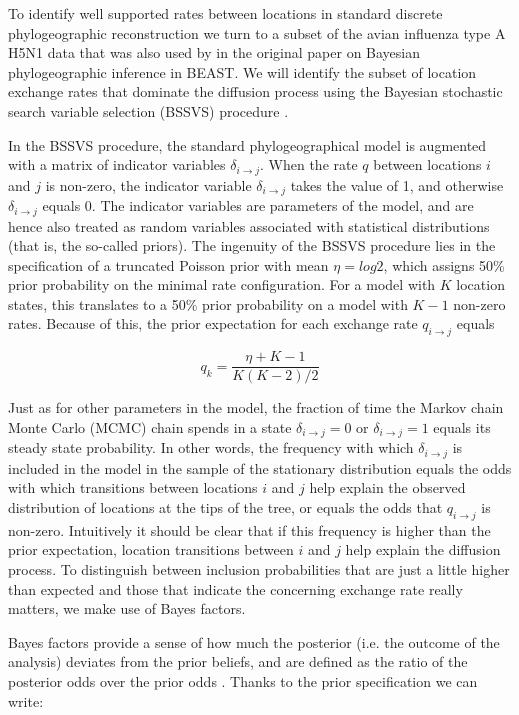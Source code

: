 \documentclass[english]{paper}
\begin{document}
To identify well supported rates between locations in standard discrete phylogeographic reconstruction we turn to a subset of the avian influenza type A H5N1 data that was also used by \citet{lemey:2009fk} in the original paper on  Bayesian phylogeographic inference in BEAST.
We will identify the subset of location exchange rates that dominate the diffusion process using the Bayesian stochastic search variable selection (BSSVS) procedure \citep{lemey:2009fk}. %
\par
In the BSSVS procedure, the standard phylogeographical model is augmented with a matrix of indicator variables $\delta_{i{\rightarrow}j}$. %
When the rate  $q$ between locations $i$ and $j$ is non-zero, the indicator variable $\delta_{i{\rightarrow}j}$ takes the value of 1, and otherwise $\delta_{i{\rightarrow}j}$ equals 0.
The indicator variables are parameters of the model, and are hence also treated as random variables associated with statistical distributions (that is, the so-called priors).
The ingenuity of the BSSVS procedure lies in the specification of a truncated Poisson prior with mean $\eta = log2$, which assigns 50\% prior probability on the minimal rate configuration. 
For a model with $K$ location states, this translates to a 50\% prior probability on a model with $K-1$ non-zero rates.
Because of this, the prior expectation for each exchange rate $q_{i{\rightarrow}j}$ equals  

$$ q_k = \frac{\eta + K - 1}{K(K-2)/2}$$

Just as for other parameters in the model, the fraction of time the Markov chain Monte Carlo (MCMC) chain spends in a state $\delta_{i{\rightarrow}j} = 0$ or $\delta_{i{\rightarrow}j} = 1$ equals its steady state probability.
In other words, the frequency with which $\delta_{i{\rightarrow}j}$ is included in the model in the sample of the stationary distribution equals the odds with which transitions between locations $i$ and $j$ help explain the observed distribution of locations at the tips of the tree, or equals the odds that $q_{i{\rightarrow}j}$ is non-zero.
Intuitively it should be clear that if this frequency is higher than the prior expectation, location transitions between $i$ and $j$ help explain the diffusion process. 
To distinguish between inclusion probabilities that are just a little higher than expected and those that indicate the  concerning exchange rate really matters, we make use of Bayes factors.
\par
Bayes factors provide a sense of how much the posterior (i.e. the outcome of the analysis) deviates from the prior beliefs, and are defined as the ratio of the posterior odds over the prior odds \citep{kass:1995a}.
Thanks to the prior specification we can write:
\end{document}
